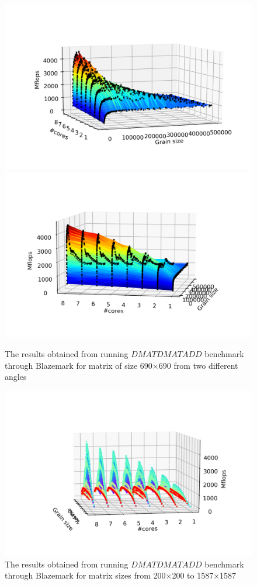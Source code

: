 \vspace{\baselineskip}	
\begin{figure}[H]
	\centering
	\includegraphics[width=1\linewidth]{images/fig2.png}
	\includegraphics[width=1\linewidth]{images/fig3.png}
	\caption{The results obtained from running $DMATDMATADD$ benchmark through Blazemark for matrix of size 690$\times$690 from two different angles}	
	\label{fig1}
\end{figure}

\begin{figure}[H]
	\centering
	\includegraphics[width=1\linewidth]{images/fig4.png}
	\caption{The results obtained from running $DMATDMATADD$ benchmark through Blazemark for matrix sizes from 200$\times$200 to 1587$\times$1587}	
	\label{fig4}
\end{figure}

